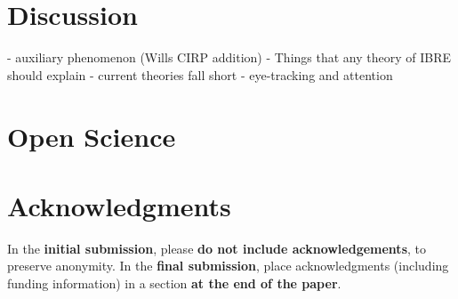 \documentclass[10pt,letterpaper]{article}
\begin{document}
\section{Discussion}

- auxiliary phenomenon (Wills CIRP addition)
- Things that any theory of IBRE should explain
- current theories fall short
- eye-tracking and attention

\section{Open Science}

\section{Acknowledgments}

In the \textbf{initial submission}, please \textbf{do not include
  acknowledgements}, to preserve anonymity.  In the \textbf{final submission},
place acknowledgments (including funding information) in a section \textbf{at
the end of the paper}.



\setlength{\bibleftmargin}{.125in}
\setlength{\bibindent}{-\bibleftmargin}


\end{document}
